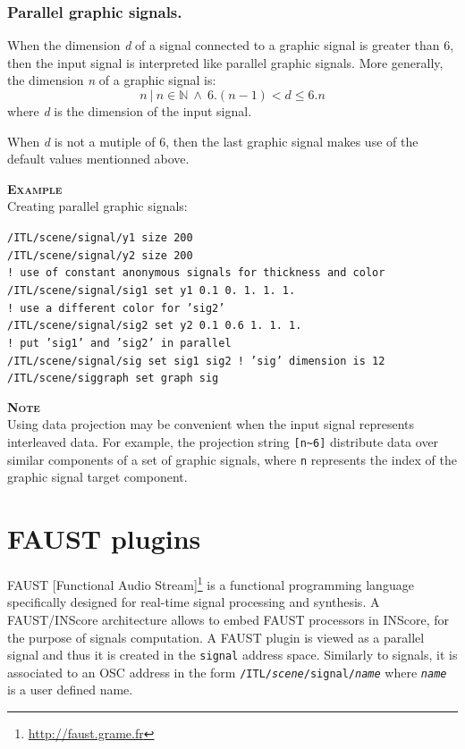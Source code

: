 \documentclass[a4paper,twoside]{report}
\newcommand{\toplevel}[1]	{\chapter{#1}}
\newcommand{\subsublevel}[1]	{\subsection{#1}}
\newcommand{\OSC}[1]		{\texttt{#1}}
\newcommand{\example}		{\textbf{\hspace{-1.5cm}\textbf{\textsc{Example }}}}
\newcommand{\note}	[1]		{\vspace{2mm}\textbf{\hspace{-1.03cm}\textbf{\textsc{Note #1}}}}
\newcommand{\sample}	[1]			{\vspace{-2mm}\begin{center}\colorbox{mygrey}{
								\begin{minipage}[t]{0.9\columnwidth} 
								{\small \texttt{#1}}
								\end{minipage}}\end{center}}
\begin{document}
\subsublevel{Parallel graphic signals.}
\label{pgsignal}
When the dimension \textit{d} of a signal connected to a graphic signal is greater than 6, then the input signal is interpreted like parallel graphic signals. More generally, the dimension \textit{n} of a graphic signal is:
\[
n  \  |\ n \in \mathbb{N}\ \land\ 6.(n-1) < d \leqslant 6.n
\]
where \textit{d} is the dimension of the input signal.

When \textit{d} is not a mutiple of 6, then the last graphic signal makes use of the default values mentionned above.

 
\example \\
Creating parallel graphic signals:
\sample{/ITL/scene/signal/y1 size 200  \\
/ITL/scene/signal/y2 size 200  \\
! use of constant anonymous signals for thickness and color\\
/ITL/scene/signal/sig1 set y1 0.1 0. 1. 1. 1.  \\
! use a different color for 'sig2'\\
/ITL/scene/signal/sig2 set y2 0.1 0.6 1. 1. 1.  \\
! put 'sig1' and 'sig2' in parallel\\
/ITL/scene/signal/sig set sig1 sig2    \hspace{1CM}! 'sig' dimension is 12\\
/ITL/scene/siggraph set graph sig 
}

\note{} \\
Using data projection may be convenient when the input signal represents interleaved data. For example, the projection string \OSC{[n\~{}6]} distribute data over similar components of a set of graphic signals, where \OSC{n} represents the index of the graphic signal target component.


\toplevel{FAUST plugins}
\label{faust}

FAUST [Functional Audio Stream]\footnote{\url{http://faust.grame.fr}} is a functional programming language specifically designed for real-time signal processing and synthesis. A FAUST/INScore architecture allows to embed FAUST processors in INScore, for the purpose of signals computation. A FAUST plugin is viewed as a parallel signal and thus it is created in the \OSC{signal} address space. Similarly to signals, it is associated to an OSC address in the form \OSC{/ITL/\emph{scene}/signal/\emph{name}} where \OSC{\emph{name}} is a user defined name.
\end{document}
